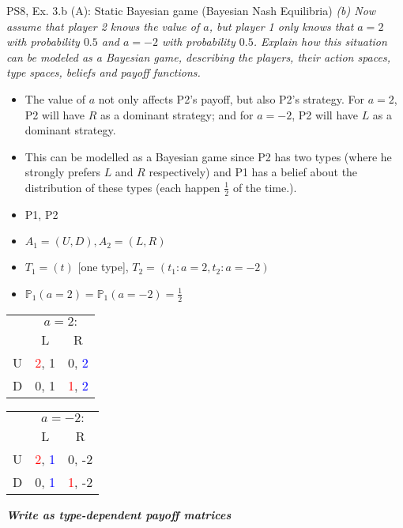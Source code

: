 \begin{frame}{PS8, Ex. 3.b (A): Static Bayesian game (Bayesian Nash Equilibria)}
    \textit{(b) Now assume that player 2 knows the value of $a$, but player 1 only knows that $a=2$ with probability $0.5$ and $a=-2$ with probability $0.5$. Explain how this situation can be modeled as a Bayesian game, describing the players, their action spaces, type spaces, beliefs and payoff functions.}
    \vspace{-8pt}
    \begin{multicols}{2}
      \begin{itemize}
      \item[(a)] The value of $a$ not only affects P2's payoff, but also P2's strategy. For $a=2$, P2 will have $R$ as a dominant strategy; and for $a=-2$, P2 will have $L$ as a dominant strategy.
      \item[(b)] This can be modelled as a Bayesian game since P2 has two types (where he strongly prefers $L$ and $R$ respectively) and P1 has a belief about the distribution of these types (each happen $\frac{1}{2}$ of the time.).
          \item[Players:] P1, P2
          \item[Action sp.:] $A_1=(U,D),A_2=(L,R)$
          \item[Type space:] $T_1=(t)$ [one type], $T_2=(t_1:a=2,t_2:a=-2)$
          \item[Beliefs:] $\mathbb{P}_1(a=2)=\mathbb{P}_1(a=-2)=\frac{1}{2}$
      \end{itemize}
      \vfill\null\columnbreak
      \begin{table}
          \begin{tabular}{l|c|c|}
          \multicolumn{1}{c}{} & \multicolumn{2}{c}{$a=2:$} \\
          \multicolumn{1}{c}{} & \multicolumn{1}{c}{L} & \multicolumn{1}{c}{\color{blue}R} \\\cline{2-3}
          U & \textcolor{red}{2}, 1 & 0, \textcolor{blue}{2} \\\cline{2-3}
          D & 0, 1 & \textcolor{red}{1}, \textcolor{blue}{2} \\\cline{2-3}
        \end{tabular}
      \end{table}
      \vspace{-8pt}
      \begin{table}
        \begin{tabular}{l|c|c|}
          \multicolumn{1}{c}{} & \multicolumn{2}{c}{$a=-2:$} \\
          \multicolumn{1}{c}{} & \multicolumn{1}{c}{\color{blue}L} & \multicolumn{1}{c}{R} \\\cline{2-3}
          U & \textcolor{red}{2}, \textcolor{blue}{1} & 0, -2 \\\cline{2-3}
          D & 0, \textcolor{blue}{1} & \textcolor{red}{1}, -2 \\\cline{2-3}
        \end{tabular}
      \end{table}
      \textbf{\textit{Write as type-dependent payoff matrices}}
      \vfill\null
    \end{multicols}
\end{frame}
